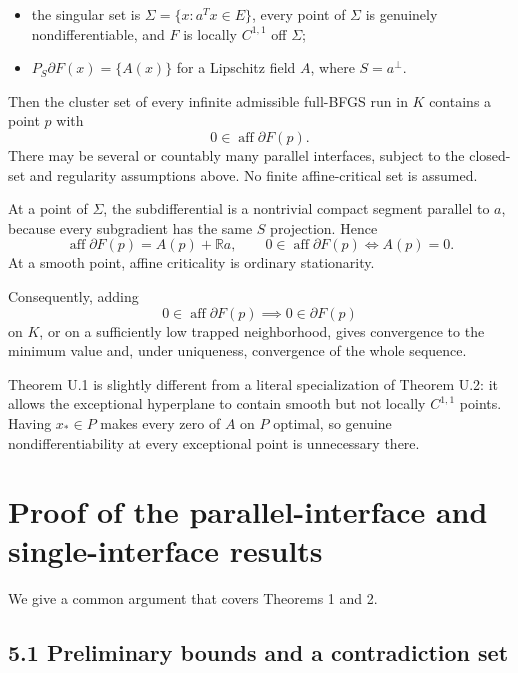 \documentclass[10pt,oneside,openany]{book}
\providecommand{\tightlist}{\setlength{\itemsep}{0pt}\setlength{\parskip}{0pt}}
\theoremstyle{remark}\newtheorem{remark}{Remark}[chapter]
\begin{document}
\begin{itemize}
\tightlist
\item
  the singular set is \(\Sigma=\{x:a^Tx\in E\}\), every point of
  \(\Sigma\) is genuinely nondifferentiable, and \(F\) is locally
  \(C^{1,1}\) off \(\Sigma\);
\item
  \(P_S\partial F(x)=\{A(x)\}\) for a Lipschitz field \(A\), where
  \(S=a^\perp\).
\end{itemize}

Then the cluster set of every infinite admissible full-BFGS run in \(K\)
contains a point \(p\) with \[
 \boxed{0\in\operatorname{aff}\partial F(p).}
\] There may be several or countably many parallel interfaces, subject
to the closed-set and regularity assumptions above. No finite
affine-critical set is assumed.

At a point of \(\Sigma\), the subdifferential is a nontrivial compact
segment parallel to \(a\), because every subgradient has the same \(S\)
projection. Hence \[
 \operatorname{aff}\partial F(p)=A(p)+\mathbb R a,
 \qquad
 0\in\operatorname{aff}\partial F(p)\iff A(p)=0.
\] At a smooth point, affine criticality is ordinary stationarity.

Consequently, adding \[
 0\in\operatorname{aff}\partial F(p)\implies0\in\partial F(p)
\] on \(K\), or on a sufficiently low trapped neighborhood, gives
convergence to the minimum value and, under uniqueness, convergence of
the whole sequence.

Theorem U.1 is slightly different from a literal specialization of Theorem U.2: it allows the exceptional hyperplane to contain smooth but not
locally \(C^{1,1}\) points. Having \(x_*\in P\) makes every zero of
\(A\) on \(P\) optimal, so genuine nondifferentiability at every
exceptional point is unnecessary there.


\setcounter{section}{4}
\setcounter{theorem}{0}
\setcounter{lemma}{0}
\setcounter{corollary}{0}
\setcounter{proposition}{0}
\setcounter{remark}{0}
\setcounter{equation}{0}
\section{Proof of the parallel-interface and single-interface
results}\label{U:proof-of-the-parallel-interface-and-single-interface-results}

We give a common argument that covers Theorems 1 and 2.

\subsection{5.1 Preliminary bounds and a contradiction
set}\label{U:preliminary-bounds-and-a-contradiction-set}
\end{document}
